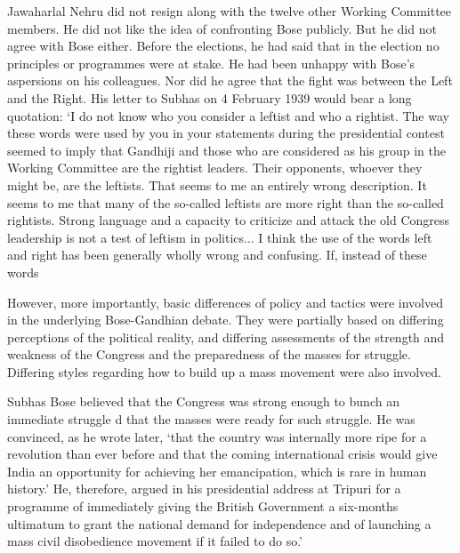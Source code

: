 Jawaharlal Nehru did not resign along with the twelve other Working Committee members. He did not like the idea of confronting Bose publicly. But he did not agree with Bose either. Before the elections, he had said that in the election no principles or programmes were at stake. He had been unhappy with Bose's aspersions on his colleagues. Nor did he agree that the fight was between the Left and the Right. His letter to Subhas on 4 February 1939 would bear a long quotation: `I do not know who you consider a leftist and who a rightist. The way these words were used by you in your statements during the presidential contest seemed to imply that Gandhiji and those who are considered as his group in the Working Committee are the rightist leaders. Their opponents, whoever they might be, are the leftists. That seems to me an entirely wrong description. It seems to me that many of the so-called leftists are more right than the so-called rightists. Strong language and a capacity to criticize and attack the old Congress leadership is not a test of leftism in politics... I think the use of the words left and right has been generally wholly wrong and confusing. If, instead of these words%

However, more importantly, basic differences of policy and tactics were involved in the underlying Bose-Gandhian debate. They were partially based on differing perceptions of the political reality, and differing assessments of the strength and weakness of the Congress and the preparedness of the masses for struggle. Differing styles regarding how to build up a mass movement were also involved. 

Subhas Bose believed that the Congress was strong enough to bunch an immediate struggle d that the masses were ready for such struggle. He was convinced, as he wrote later, `that the country was internally more ripe for a revolution than ever before and that the coming international crisis would give India an opportunity for achieving her emancipation, which is rare in human history.' He, therefore, argued in his presidential address at Tripuri for a programme of immediately giving the British Government a six-months ultimatum to grant the national demand for independence and of launching a mass civil disobedience movement if it failed to do so.' 

